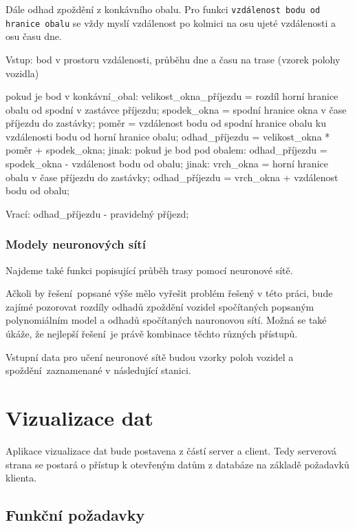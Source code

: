 Dále odhad zpoždění z konkávního obalu. Pro funkci \verb-vzdálenost bodu od hranice obalu- se vždy myslí vzdálenost po kolmici na osu ujeté vzdálenosti a osu času dne.

\begin{code}[frame=none]
Vstup: bod v prostoru vzdálenosti, průběhu dne
  a času na trase (vzorek polohy vozidla)

pokud je bod v konkávní_obal:
  velikost_okna_příjezdu = rozdíl horní hranice obalu od spodní
    v zastávce příjezdu;
  spodek_okna = spodní hranice okna v čase
    příjezdu do zastávky;
  poměr = vzdálenost bodu od spodní hranice obalu
	ku vzdálenosti bodu od horní hranice obalu;
  odhad_příjezdu = velikost_okna * poměr + spodek_okna;
jinak:
  pokud je bod pod obalem:
    odhad_příjezdu = spodek_okna - vzdálenost bodu od obalu;
  jinak:
    vrch_okna = horní hranice obalu
	  v čase příjezdu do zastávky;
    odhad_příjezdu = vrch_okna + vzdálenost bodu od obalu;

Vrací: odhad_příjezdu - pravidelný příjezd;
\end{code}

\subsubsection{Modely neuronových sítí}

Najdeme také funkci popisující průběh trasy pomocí neuronové sítě.

\bigbreak

Ačkoli by řešení popsané výše mělo vyřešit problém řešený v této práci, bude zajímé pozorovat rozdíly odhadů zpoždění vozidel spočítaných popsaným polynomiálním model a odhadů spočítaných nauronovou sítí. Možná se také úkáže, že nejlepší řešení je právě kombinace těchto různých přístupů.

\bigbreak

Vstupní data pro učení neuronové sítě budou vzorky poloh vozidel a spoždění zaznamenané v následující stanici.


\section{Vizualizace dat}

 Aplikace vizualizace dat bude postavena z částí server a client. Tedy serverová strana se postará o přístup k otevřeným datům z databáze na základě požadavků klienta.

\subsection{Funkční požadavky}

